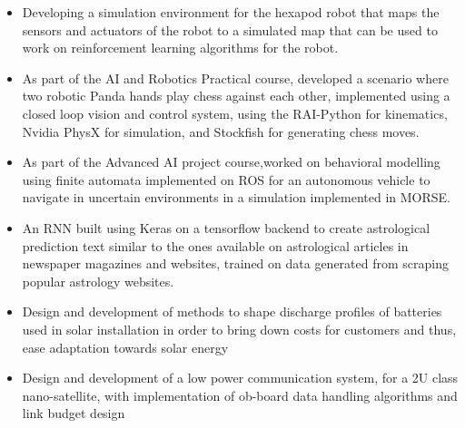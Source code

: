 
\begin{itemize}
    \item Developing a simulation environment for the hexapod robot that maps the sensors and actuators of the robot to a simulated map that can be used to work on reinforcement learning algorithms for the robot.
\end{itemize}

\divider

\begin{itemize}
    \item As part of the AI and Robotics Practical course, developed a scenario where two robotic Panda hands play chess against each other, implemented using a closed loop vision and control system, using the RAI-Python for kinematics, Nvidia PhysX for simulation, and Stockfish for generating chess moves.  
\end{itemize}

\divider

\begin{itemize}
    \item As part of the Advanced AI project course,worked on behavioral modelling using finite automata implemented on ROS for an autonomous vehicle to navigate in uncertain environments in a simulation implemented in MORSE. 
\end{itemize}

\divider

\begin{itemize}
    \item An RNN built using Keras on a tensorflow backend to create astrological prediction text similar to the ones available on astrological articles in newspaper magazines and websites, trained on data generated from scraping popular astrology websites.
\end{itemize}

\divider

\begin{itemize}
\item Design and development of methods to shape discharge profiles of batteries used in solar installation in order to bring down costs for customers and thus, ease adaptation towards solar energy
\end{itemize}

\divider

\begin{itemize}
\item Design and development of a low power communication system, for a 2U class nano-satellite, with implementation of ob-board data handling algorithms and link budget design
\end{itemize}

